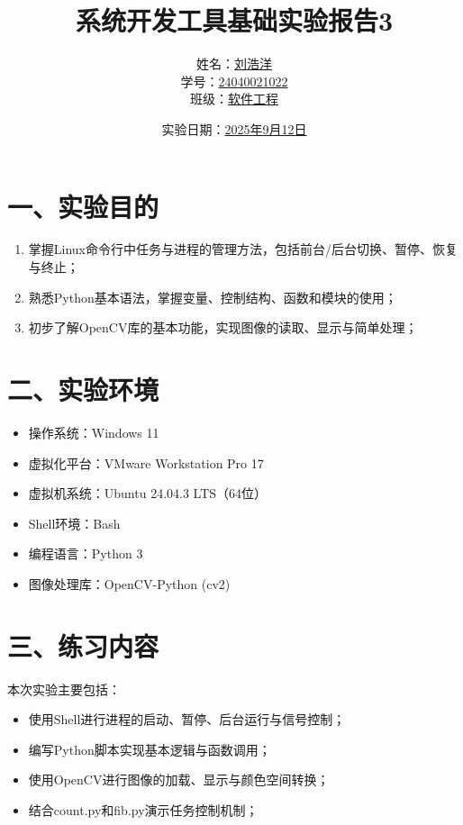 \documentclass[a4paper, 12pt]{article}
\begin{document}
\title{\huge{系统开发工具基础实验报告3}}
\author{姓名：\underline{刘浩洋} \\ 
        学号：\underline{24040021022} \\ 
        班级：\underline{软件工程}}
\date{实验日期：\underline{2025年9月12日}}
\maketitle

\section*{一、实验目的}
\begin{enumerate}
    \item 掌握Linux命令行中任务与进程的管理方法，包括前台/后台切换、暂停、恢复与终止；
    \item 熟悉Python基本语法，掌握变量、控制结构、函数和模块的使用；
    \item 初步了解OpenCV库的基本功能，实现图像的读取、显示与简单处理；
\end{enumerate}

\section*{二、实验环境}
\begin{itemize}
    \item 操作系统：Windows 11
    \item 虚拟化平台：VMware Workstation Pro 17
    \item 虚拟机系统：Ubuntu 24.04.3 LTS（64位）
    \item Shell环境：Bash
    \item 编程语言：Python 3
    \item 图像处理库：OpenCV-Python (cv2)
\end{itemize}

\section*{三、练习内容}
本次实验主要包括：
\begin{itemize}
    \item 使用Shell进行进程的启动、暂停、后台运行与信号控制；
    \item 编写Python脚本实现基本逻辑与函数调用；
    \item 使用OpenCV进行图像的加载、显示与颜色空间转换；
    \item 结合count.py和fib.py演示任务控制机制；
\end{itemize}
\end{document}
